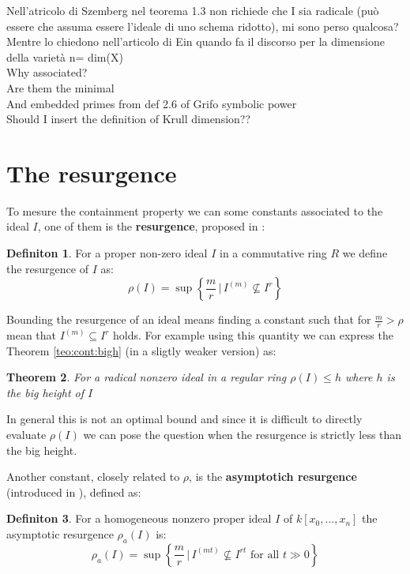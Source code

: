 \documentclass[]{book}
\theoremstyle{plain}
\newtheorem{teo}{Theorem}[section]
\theoremstyle{remark}
\theoremstyle{definition}
\newtheorem{deff}[teo]{Definiton}
\newcommand{\cont}[2]{ I^{(#1)} \subseteq I^{#2}}
\begin{document}
	 
	\begin{tcolorbox}
		Nell'atricolo di Szemberg nel teorema 1.3 non richiede che I sia radicale (può essere che assuma essere l'ideale di uno schema ridotto), mi sono perso qualcosa? Mentre lo chiedono nell'articolo di Ein quando fa il discorso per la dimensione della varietà n= dim(X)\\
		Why associated?\\
		Are them the minimal\\
		And embedded primes from def 2.6 of Grifo symbolic power\\
		Should I insert the definition of Krull dimension??
	\end{tcolorbox}
	

\section{The resurgence}
To mesure the containment property we can some constants associated to the ideal $ I $, one of them is the \textbf{resurgence}, proposed in \cite{Boc09resurgence}:
\begin{deff}
	For a proper non-zero ideal $ I $ in a commutative ring $ R $ we define the resurgence of $ I $ as:
	\begin{equation*}
		\rho(I)= \sup \left\lbrace \frac{m}{r} \, | \, I^{(m)} \not \subseteq I^r \right\rbrace 
	\end{equation*}
\end{deff}
Bounding the resurgence of an ideal means finding a constant such that for $ \frac{m}{r} > \rho $ mean that $ \cont{m}{r} $ holds.
For example using this quantity we can express the Theorem \ref{teo:cont:bigh} (in a sligtly weaker version) as:
\begin{teo}
	For a radical nonzero ideal in a regular ring $ \rho(I) \leq h $ where $ h $ is the big height of $ I $
\end{teo}
In general this is not an optimal bound and since it is difficult to directly evaluate $ \rho(I) $ we can pose the question when the resurgence is strictly less than the big height. 

Another constant, closely related to $ \rho $, is the \textbf{asymptotich resurgence} (introduced in \cite{Guardo2012}), defined as:
\begin{deff}
	For a homogeneous nonzero proper ideal $ I $ of $ k[x_0 , ... , x_n] $ the asymptotic resurgence $ \rho_a(I) $ is:
	\[ \rho_a(I) = \sup \left\lbrace \frac{m}{r} \, | \, I^{(mt)} \not \subseteq I^{rt} \text{ for all } t \gg 0 \right\rbrace \]
\end{deff}
\end{document}
